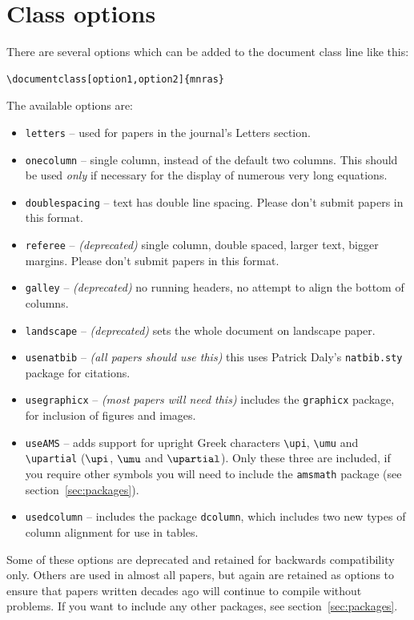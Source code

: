 \documentclass[fleqn,usenatbib,useAMS]{mnras}
\begin{document}
\section{Class options}
\label{sec:options}
There are several options which can be added to the document class line like this:

\begin{verbatim}
\documentclass[option1,option2]{mnras}
\end{verbatim}
The available options are:
\begin{itemize}
\item \verb'letters' -- used for papers in the journal's Letters section.
\item \verb'onecolumn' -- single column, instead of the default two columns. This should be used {\it only} if necessary for the display of numerous very long equations.
\item \verb'doublespacing' -- text has double line spacing. Please don't submit papers in this format.
\item \verb'referee' -- \textit{(deprecated)} single column, double spaced, larger text, bigger margins. Please don't submit papers in this format.
\item \verb'galley' -- \textit{(deprecated)} no running headers, no attempt to align the bottom of columns.
\item \verb'landscape' -- \textit{(deprecated)} sets the whole document on landscape paper.
\item \verb"usenatbib" -- \textit{(all papers should use this)} this uses Patrick Daly's \verb"natbib.sty" package for citations.
\item \verb"usegraphicx" -- \textit{(most papers will need this)} includes the \verb'graphicx' package, for inclusion of figures and images.
\item \verb'useAMS' -- adds support for upright Greek characters \verb'\upi', \verb'\umu' and \verb'\upartial' ($\upi$, $\umu$ and $\upartial$). Only these three are included, if you require other symbols you will need to include the \verb'amsmath' package (see section~\ref{sec:packages}).
\item \verb"usedcolumn" -- includes the package \verb"dcolumn", which includes two new types of column alignment for use in tables.
\end{itemize}

Some of these options are deprecated and retained for backwards compatibility only.
Others are used in almost all papers, but again are retained as options to ensure that papers written decades ago will continue to compile without problems.
If you want to include any other packages, see section~\ref{sec:packages}.
\end{document}
